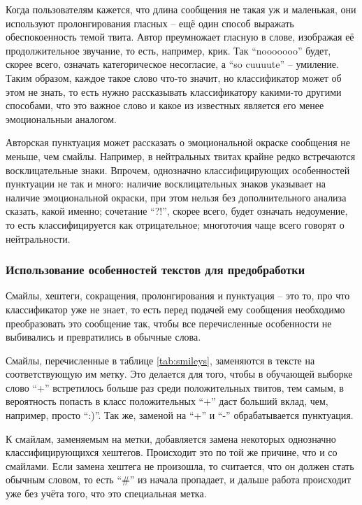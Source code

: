Когда пользователям кажется, что длина сообщения не такая уж и маленькая, они используют
пролонгирования гласных -- ещё один способ выражать обеспокоенность темой твита. Автор преумножает
гласную в слове, изображая её продолжительное звучание, то есть, например, крик. Так ``nooooooo''
будет, скорее всего, означать категорическое несогласие, а ``so cuuuute'' -- умиление. Таким
образом, каждое такое слово что-то значит, но классификатор может об этом не знать, то есть нужно
рассказывать классификатору какими-то другими способами, что это важное слово и какое из известных
является его менее эмоциональныи аналогом.

Авторская пунктуация может рассказать о эмоциональной окраске сообщения не меньше, чем
смайлы. Например, в нейтральных твитах крайне редко встречаются восклицательные знаки. Впрочем,
однозначно классифицирующих особенностей пунктуации не так и много: наличие восклицательных знаков
указывает на наличие эмоциональной окраски, при этом нельзя без дополнительного анализа сказать,
какой именно; сочетание ``?!'', скорее всего, будет означать недоумение, то есть классифицируется
как отрицательное; многоточия чаще всего говорят о нейтральности.

\subsubsection{Использование особенностей текстов для предобработки}\label{spec}
Смайлы, хештеги, сокращения, пролонгирования и пунктуация -- это то, про что классификатор уже не
знает, то есть перед подачей ему сообщения необходимо преобразовать это сообщение так, чтобы все
перечисленные особенности не выбивались и превратились в обычные слова.

Смайлы, перечисленные в таблице \ref{tab:smileys}, заменяются в тексте на соответствующую им
метку. Это делается для того, чтобы в обучающей выборке слово ``+'' встретилось больше раз среди
положительных твитов, тем самым, в вероятность попасть в класс положительных ``+'' даст больший
вклад, чем, например, просто ``:)''. Так же, заменой на ``+'' и ``-'' обрабатывается пунктуация.

К смайлам, заменяемым на метки, добавляется замена некоторых однозначно классифицирующихся
хештегов. Происходит это по той же причине, что и со смайлами. Если замена хештега не произошла, то
считается, что он должен стать обычным словом, то есть ``\#'' из начала пропадает, и дальше работа
происходит уже без учёта того, что это специальная метка.

